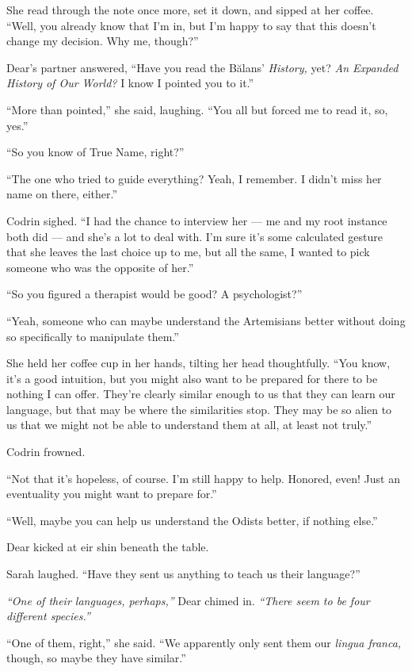 She read through the note once more, set it down, and sipped at her coffee. ``Well, you already know that I'm in, but I'm happy to say that this doesn't change my decision. Why me, though?''

Dear's partner answered, ``Have you read the Bălans' \emph{History,} yet? \emph{An Expanded History of Our World?} I know I pointed you to it.''

``More than pointed,'' she said, laughing. ``You all but forced me to read it, so, yes.''

``So you know of True Name, right?''

``The one who tried to guide everything? Yeah, I remember. I didn't miss her name on there, either.''

Codrin sighed. ``I had the chance to interview her — me and my root instance both did — and she's a lot to deal with. I'm sure it's some calculated gesture that she leaves the last choice up to me, but all the same, I wanted to pick someone who was the opposite of her.''

``So you figured a therapist would be good? A psychologist?''

``Yeah, someone who can maybe understand the Artemisians better without doing so specifically to manipulate them.''

She held her coffee cup in her hands, tilting her head thoughtfully. ``You know, it's a good intuition, but you might also want to be prepared for there to be nothing I can offer. They're clearly similar enough to us that they can learn our language, but that may be where the similarities stop. They may be so alien to us that we might not be able to understand them at all, at least not truly.''

Codrin frowned.

``Not that it's hopeless, of course. I'm still happy to help. Honored, even! Just an eventuality you might want to prepare for.''

``Well, maybe you can help us understand the Odists better, if nothing else.''

Dear kicked at eir shin beneath the table.

Sarah laughed. ``Have they sent us anything to teach us their language?''

\emph{``One of their languages, perhaps,''} Dear chimed in. \emph{``There seem to be four different species.''}

``One of them, right,'' she said. ``We apparently only sent them our \emph{lingua franca,} though, so maybe they have similar.''

